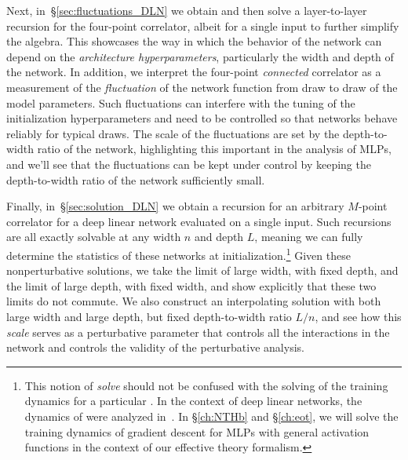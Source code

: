 Next, in~\S\ref{sec:fluctuations_DLN} we obtain and then 
solve a layer-to-layer recursion for the four-point correlator, 
albeit for a single input to further simplify the algebra. 
This showcases the way in which the behavior of the network can depend on the \emph{architecture hyperparameters}, particularly the width and depth of the network. 
In addition, we interpret the four-point \emph{connected} correlator as a measurement of the \emph{fluctuation} of the network function from
draw to
draw of the model parameters. 
Such fluctuations can interfere with the tuning of the initialization hyperparameters
and need to be controlled so that networks
behave reliably for typical draws. 
The scale of the fluctuations are set by the depth-to-width ratio of the network, highlighting this important  in the analysis of MLPs, and we'll see that 
the fluctuations can be kept under control by
keeping the depth-to-width ratio of the network sufficiently small.

Finally, in~\S\ref{sec:solution_DLN} we obtain a recursion for 
an arbitrary $M$-point
correlator for a deep linear network evaluated on a single input. Such recursions are all exactly solvable at any width 
$n$ and depth $L$, meaning we can fully determine the statistics of these networks at initialization.\footnote{This notion of \emph{solve} should not be confused with the solving of the training dynamics for a particular . In the context of deep linear networks, the dynamics of  were analyzed in~\cite{saxe2013exact}.  In \S\ref{ch:NTHb} and \S\ref{ch:eot}, we will solve the training dynamics of gradient descent for MLPs with general activation functions in the context of our effective theory formalism.
}
Given these nonperturbative solutions, we
take the limit of large width, with fixed depth, and the limit of large depth, with fixed width, and show explicitly that these two limits do not commute. 
We also construct an interpolating solution with both large width and large depth, but fixed depth-to-width ratio $L/n$, and see how this 
\emph{scale}
serves as a perturbative parameter that controls 
all the 
interactions 
in the network
and 
controls
the validity of the perturbative analysis.








